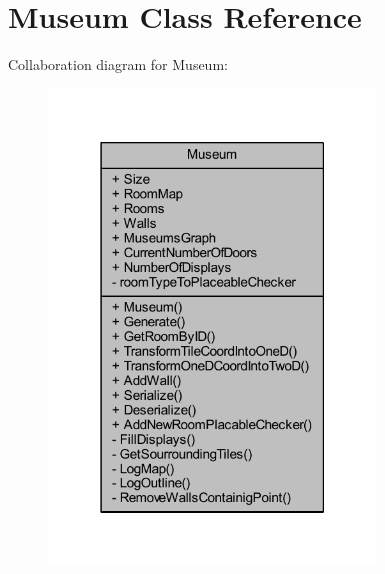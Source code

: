 \hypertarget{class_museum}{}\section{Museum Class Reference}
\label{class_museum}


Collaboration diagram for Museum\+:
\nopagebreak
\begin{figure}[H]
\begin{center}
\leavevmode
\includegraphics[width=247pt]{class_museum__coll__graph}
\end{center}
\end{figure}
